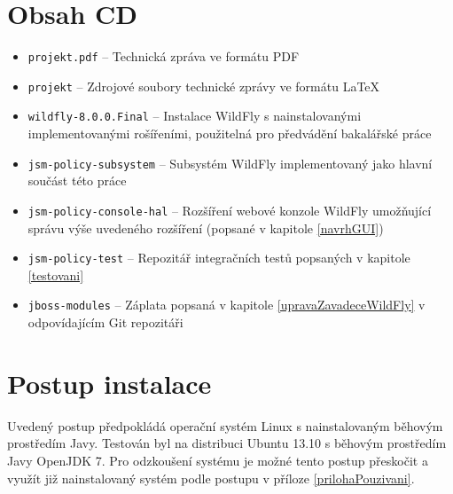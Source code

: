 \chapter{Obsah CD}

\begin{itemize}
  \item {\tt projekt.pdf} -- Technická zpráva ve formátu PDF
  \item {\tt projekt} -- Zdrojové soubory technické zprávy ve formátu \LaTeX

  \item {\tt wildfly-8.0.0.Final} -- Instalace WildFly s nainstalovanými implementovanými rošířeními, použitelná pro předvádění bakalářské práce

  \item {\tt jsm-policy-subsystem} -- Subsystém WildFly implementovaný jako hlavní součást této práce
  \item {\tt jsm-policy-console-hal} -- Rozšíření webové konzole WildFly umožňující správu výše uvedeného rozšíření (popsané v kapitole \ref{navrhGUI})
  \item {\tt jsm-policy-test} -- Repozitář integračních testů popsaných v kapitole \ref{testovani}

  \item {\tt jboss-modules} -- Záplata popsaná v kapitole \ref{upravaZavadeceWildFly} v odpovídajícím Git repozitáři
\end{itemize}


\chapter{Postup instalace}\label{prilohaInstalace}

Uvedený postup předpokládá operační systém Linux s nainstalovaným běhovým prostředím Javy. Testován byl na distribuci Ubuntu 13.10 s běhovým prostředím Javy OpenJDK 7. Pro odzkoušení systému je možné tento postup přeskočit a využít již nainstalovaný systém podle postupu v příloze \ref{prilohaPouzivani}.

